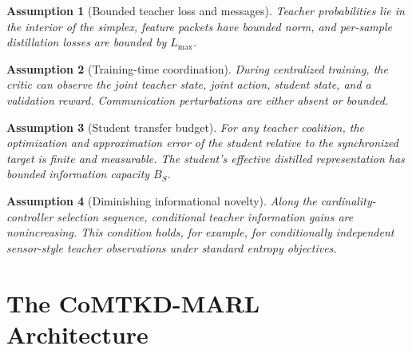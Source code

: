 \documentclass[10pt,twocolumn,a4paper]{article}
\newtheorem{assumption}{Assumption}
\begin{document}
\begin{assumption}[Bounded teacher loss and messages]
Teacher probabilities lie in the interior of the simplex, feature packets have bounded norm, and per-sample distillation losses are bounded by \(L_{\max}\).
\end{assumption}

\begin{assumption}[Training-time coordination]
During centralized training, the critic can observe the joint teacher state, joint action, student state, and a validation reward. Communication perturbations are either absent or bounded.
\end{assumption}

\begin{assumption}[Student transfer budget]
For any teacher coalition, the optimization and approximation error of the student relative to the synchronized target is finite and measurable. The student's effective distilled representation has bounded information capacity \(B_S\).
\end{assumption}

\begin{assumption}[Diminishing informational novelty]
Along the cardinality-controller selection sequence, conditional teacher information gains are nonincreasing. This condition holds, for example, for conditionally independent sensor-style teacher observations under standard entropy objectives.
\end{assumption}

\section{The CoMTKD-MARL Architecture}
\label{sec:architecture}
\end{document}
